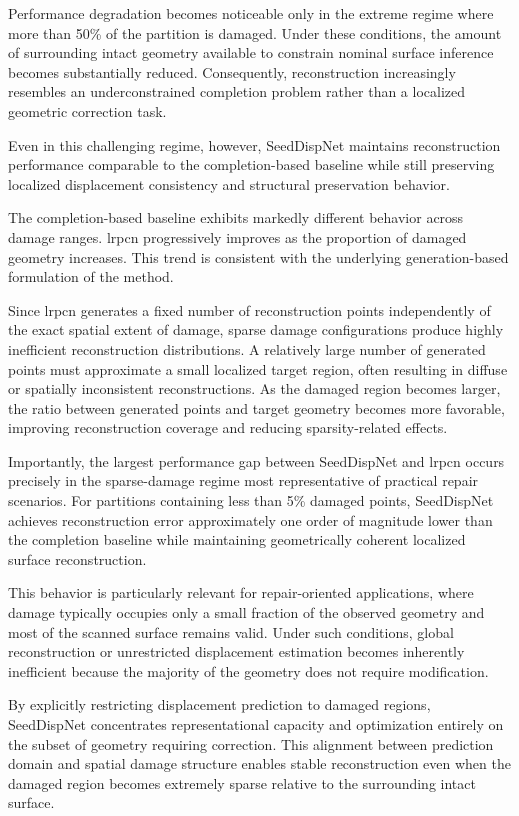 Performance degradation becomes noticeable only in the extreme regime where more than 50\% of the partition is damaged. Under these conditions, the amount of surrounding intact geometry available to constrain nominal surface inference becomes substantially reduced. Consequently, reconstruction increasingly resembles an underconstrained completion problem rather than a localized geometric correction task.

Even in this challenging regime, however, SeedDispNet maintains reconstruction performance comparable to the completion-based baseline while still preserving localized displacement consistency and structural preservation behavior.

The completion-based baseline exhibits markedly different behavior across damage ranges. \ac{lrpcn} progressively improves as the proportion of damaged geometry increases. This trend is consistent with the underlying generation-based formulation of the method.

Since \ac{lrpcn} generates a fixed number of reconstruction points independently of the exact spatial extent of damage, sparse damage configurations produce highly inefficient reconstruction distributions. A relatively large number of generated points must approximate a small localized target region, often resulting in diffuse or spatially inconsistent reconstructions. As the damaged region becomes larger, the ratio between generated points and target geometry becomes more favorable, improving reconstruction coverage and reducing sparsity-related effects.

Importantly, the largest performance gap between SeedDispNet and \ac{lrpcn} occurs precisely in the sparse-damage regime most representative of practical repair scenarios. For partitions containing less than 5\% damaged points, SeedDispNet achieves reconstruction error approximately one order of magnitude lower than the completion baseline while maintaining geometrically coherent localized surface reconstruction.

This behavior is particularly relevant for repair-oriented applications, where damage typically occupies only a small fraction of the observed geometry and most of the scanned surface remains valid. Under such conditions, global reconstruction or unrestricted displacement estimation becomes inherently inefficient because the majority of the geometry does not require modification.

By explicitly restricting displacement prediction to damaged regions, SeedDispNet concentrates representational capacity and optimization entirely on the subset of geometry requiring correction. This alignment between prediction domain and spatial damage structure enables stable reconstruction even when the damaged region becomes extremely sparse relative to the surrounding intact surface.

